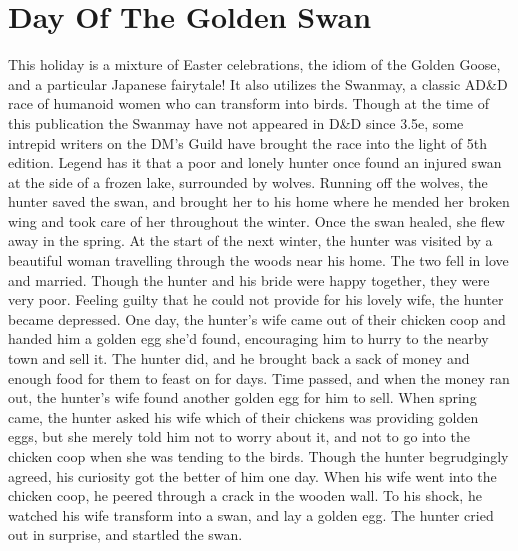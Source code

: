 \documentclass[10pt,a4paper,twoside,twocolumn,openany,bg=print,nodeprecatedcode]{dndbook}
\begin{document}
\section{Day Of The Golden Swan}
This holiday is a mixture of Easter celebrations, the idiom of the Golden Goose, and a particular Japanese fairytale! It also utilizes the Swanmay, a classic AD\&D race of humanoid women who can transform into birds. Though at the time of this publication the Swanmay have not appeared in D\&D since 3.5e, some intrepid writers on the DM's Guild have brought the race into the light of 5th edition. Legend has it that a poor and lonely hunter once found an injured swan at the side of a frozen lake, surrounded by wolves. Running off the wolves, the hunter saved the swan, and brought her to his home where he mended her broken wing and took care of her throughout the winter. Once the swan healed, she flew away in the spring. At the start of the next winter, the hunter was visited by a beautiful woman travelling through the woods near his home. The two fell in love and married. Though the hunter and his bride were happy together, they were very poor. Feeling guilty that he could not provide for his lovely wife, the hunter became depressed. One day, the hunter's wife came out of their chicken coop and handed him a golden egg she'd found, encouraging him to hurry to the nearby town and sell it. The hunter did, and he brought back a sack of money and enough food for them to feast on for days. Time passed, and when the money ran out, the hunter's wife found another golden egg for him to sell. When spring came, the hunter asked his wife which of their chickens was providing golden eggs, but she merely told him not to worry about it, and not to go into the chicken coop when she was tending to the birds. Though the hunter begrudgingly agreed, his curiosity got the better of him one day. When his wife went into the chicken coop, he peered through a crack in the wooden wall. To his shock, he watched his wife transform into a swan, and lay a golden egg. The hunter cried out in surprise, and startled the swan.
\end{document}
